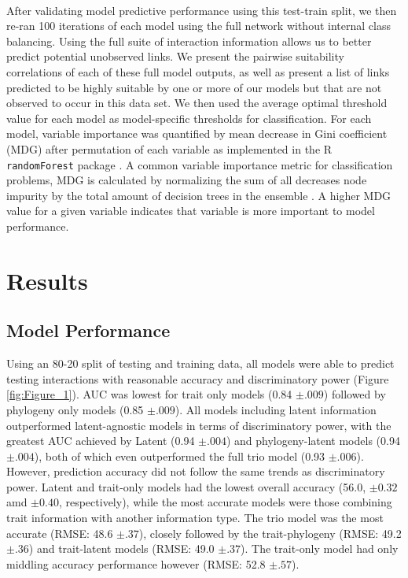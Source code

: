 \paragraph{}
After validating model predictive performance using this test-train split, we then re-ran 100 iterations of each model using the full network without internal class balancing. Using the full suite of interaction information allows us to better predict potential unobserved links. We present the pairwise suitability correlations of each of these full model outputs, as well as present a list of links predicted to be highly suitable by one or more of our models but that are not observed to occur in this data set. We then used the average optimal threshold value for each model as model-specific thresholds for classification. For each model, variable importance was quantified by mean decrease in Gini coefficient  (MDG) after permutation of each variable as implemented in the R \texttt{randomForest} package \cite{randomForest}. A common variable importance metric for classification problems, MDG is calculated by normalizing the sum of all decreases node impurity by the total amount of decision trees in the ensemble \cite{khalilia2011predicting, calle2011stability}. A higher MDG value for a given variable indicates that variable is more important to model performance. 






\section*{Results}

\subsection*{Model Performance}
Using an 80-20 split of testing and training data, all models were able to predict testing interactions with reasonable accuracy and discriminatory power (Figure \ref{fig:Figure_1}). AUC was lowest for trait only models (0.84 $\pm.009$) followed by phylogeny only models (0.85 $\pm .009$). All models including latent information outperformed latent-agnostic models in terms of discriminatory power, with the greatest AUC achieved by Latent (0.94 $\pm .004$) and phylogeny-latent models (0.94 $\pm .004$), both of which even outperformed the full trio model (0.93 $\pm .006$). However, prediction accuracy did not follow the same trends as discriminatory power. Latent and trait-only models had the lowest overall accuracy (56.0, $\pm 0.32$ amd $\pm 0.40$, respectively), while the most accurate models were those combining trait information with another information type. The trio model was the most accurate (RMSE: 48.6 $\pm .37$), closely followed by the trait-phylogeny (RMSE: 49.2 $\pm .36$) and trait-latent models (RMSE: 49.0 $\pm .37$). The trait-only model had only middling accuracy performance however (RMSE: 52.8 $\pm .57$).


